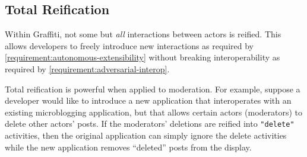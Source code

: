 
\subsection{Total Reification}
\label{concepts:total-reification}

Within Graffiti, not some but \emph{all} interactions between actors
is reified.
This allows developers to freely introduce new interactions
as required by \ref{requirement:autonomous-extensibility} without
breaking interoperability as required by \ref{requirement:adversarial-interop}.





Total reification is powerful when applied to moderation.
For example, suppose a developer would like to introduce a new application
that interoperates with an existing microblogging application,
but that allows certain actors (moderators) to delete other actors' posts.
If the moderators' deletions are reified into \texttt{"delete"} activities,
then the original application can simply ignore the delete activities
while the new application removes ``deleted'' posts from the display.

